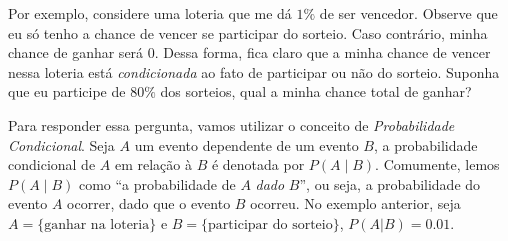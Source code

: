 \documentclass{article}
\begin{document}
            Por exemplo, considere uma loteria que me dá $1\%$ de ser vencedor.
            Observe que eu só tenho a chance de vencer se participar do sorteio.
            Caso contrário, minha chance de ganhar será $0$.
            Dessa forma, fica claro que a minha chance de vencer nessa loteria está \emph{condicionada} ao fato de participar ou não do sorteio.
            Suponha que eu participe de $80\%$ dos sorteios, qual a minha chance total de ganhar?
            
            Para responder essa pergunta, vamos utilizar o conceito de \emph{Probabilidade Condicional}.
            Seja $A$ um evento dependente de um evento $B$, a probabilidade condicional de $A$ em relação à $B$ é denotada por $P(A \mid B)$.
            Comumente, lemos $P(A \mid B)$ como ``a probabilidade de $A$ \emph{dado} $B$'', ou seja, a probabilidade do evento $A$ ocorrer, dado que o evento $B$ ocorreu.
            No exemplo anterior, seja $A = \{\text{ganhar na loteria}\}$ e $B = \{\text{participar do sorteio}\}$, $P(A | B) = 0.01$.
            
\end{document}
